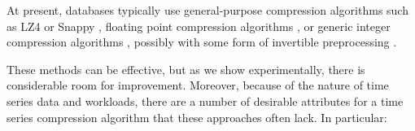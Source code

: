 
At present, databases typically use general-purpose compression algorithms such as LZ4 \cite{lz4} or Snappy \cite{snappy}, floating point compression algorithms \cite{gorilla}, or generic integer compression algorithms \cite{influxDB, simple8b}, possibly with some form of invertible preprocessing \cite{influxDB, gorilla, berkeleyTreeDB}.

These methods can be effective, but as we show experimentally, there is considerable room for improvement. Moreover, because of the nature of time series data and workloads, there are a number of desirable attributes for a time series compression algorithm that these approaches often lack. In particular:





